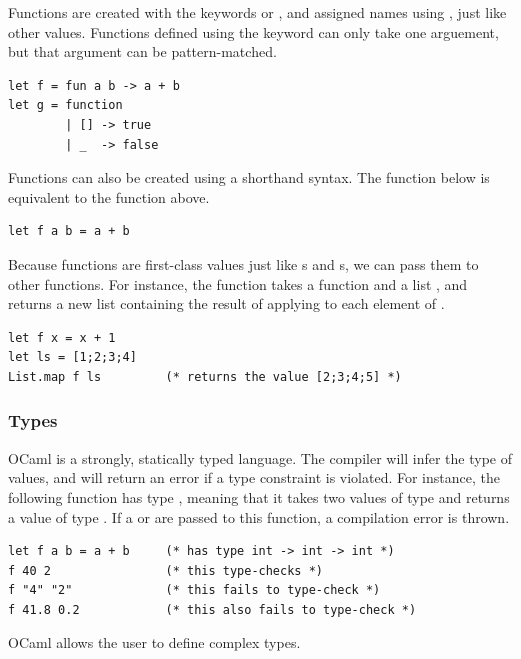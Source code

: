 Functions are created with the keywords  or ,
and assigned names using , just like other values. Functions
defined using the  keyword can only take one arguement,
but that argument can be pattern-matched.

\begin{lstlisting}
let f = fun a b -> a + b
let g = function
        | [] -> true
        | _  -> false
\end{lstlisting}

Functions can also be created using a shorthand  syntax. The
function  below is equivalent to the function  above.

\begin{lstlisting}
let f a b = a + b
\end{lstlisting}

Because functions are first-class values just like s and
s, we can pass them to other functions. For instance, the
function  takes a function  and a list
, and returns a new list containing the result of applying
 to each element of .

\begin{lstlisting}
let f x = x + 1
let ls = [1;2;3;4]
List.map f ls         (* returns the value [2;3;4;5] *)
\end{lstlisting}

\subsubsection{Types}

OCaml is a strongly, statically typed language. The compiler will
infer the type of values, and will return an error if a type
constraint is violated. For instance, the following function 
has type , meaning that it takes two values of
type  and returns a value of type . If a
 or  are passed to this function, a
compilation error is thrown.

\begin{lstlisting}
let f a b = a + b     (* has type int -> int -> int *)
f 40 2                (* this type-checks *)
f "4" "2"             (* this fails to type-check *)
f 41.8 0.2            (* this also fails to type-check *)
\end{lstlisting}

OCaml allows the user to define complex types.

